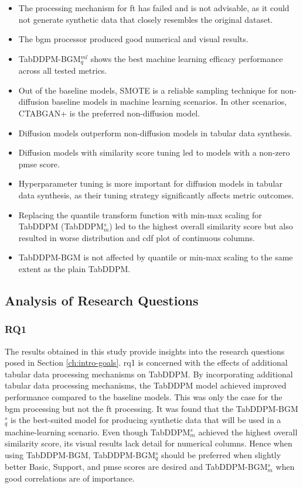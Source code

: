 \begin{itemize}
	\item The processing mechanism for \gls{ft} has failed and is not advisable, as it could not generate synthetic data that closely resembles the original dataset.
	\item The \gls{bgm} processor produced good numerical and visual results.
	\item TabDDPM-BGM$^{ml}_q$ shows the best machine learning efficacy performance across all tested metrics.
	\item Out of the baseline models, SMOTE is a reliable sampling technique for non-diffusion baseline models in machine learning scenarios.
	In other scenarios, CTABGAN+ is the preferred non-diffusion model.
	\item Diffusion models outperform non-diffusion models in tabular data synthesis.
	\item Diffusion models with similarity score tuning led to models with a non-zero \gls{pmse} score.
	\item Hyperparameter tuning is more important for diffusion models in tabular data synthesis, as their tuning strategy significantly affects metric outcomes.
	\item Replacing the quantile transform function with min-max scaling for TabDDPM (TabDDPM$^{s}_m$) led to the highest overall similarity score but also resulted in worse distribution and \gls{cdf} plot of continuous columns.
	\item TabDDPM-BGM is not affected by quantile or min-max scaling to the same extent as the plain TabDDPM.
\end{itemize}

\subsection*{Analysis of Research Questions}

\subsubsection{RQ1}

The results obtained in this study provide insights into the research questions posed in Section \ref{ch:intro-goals}.
\gls{rq}1 is concerned with the effects of additional tabular data processing mechanisms on TabDDPM.
By incorporating additional tabular data processing mechanisms, the TabDDPM model achieved improved performance compared to the baseline models.
This was only the case for the \gls{bgm} processing but not the \gls{ft} processing.
It was found that the TabDDPM-BGM$^{s}_q$ is the best-suited model for producing synthetic data that will be used in a machine-learning scenario.
Even though TabDDPM$^{s}_m$ achieved the highest overall similarity score, its visual results lack detail for numerical columns.
Hence when using TabDDPM-BGM, TabDDPM-BGM$^{s}_q$ should be preferred when slightly better Basic, Support, and \gls{pmse} scores are desired and TabDDPM-BGM$^{s}_m$ when good correlations are of importance.

